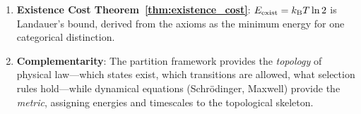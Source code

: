 \begin{chapterbox}[title=Chapter 1 — Key Results Established]
\begin{enumerate}[label=\textbf{\arabic*.}]
  \item \textbf{Existence Cost Theorem~\ref{thm:existence_cost}}:
        $E_{\mathrm{exist}} = k_{\mathrm{B}} T \ln 2$ is Landauer's bound, derived from the axioms
        as the minimum energy for one categorical distinction.

  \item \textbf{Complementarity}: The partition framework provides the
        \emph{topology} of physical law---which states exist, which transitions
        are allowed, what selection rules hold---while dynamical equations
        (Schr\"{o}dinger, Maxwell) provide the \emph{metric}, assigning
        energies and timescales to the topological skeleton.
\end{enumerate}
\end{chapterbox}
